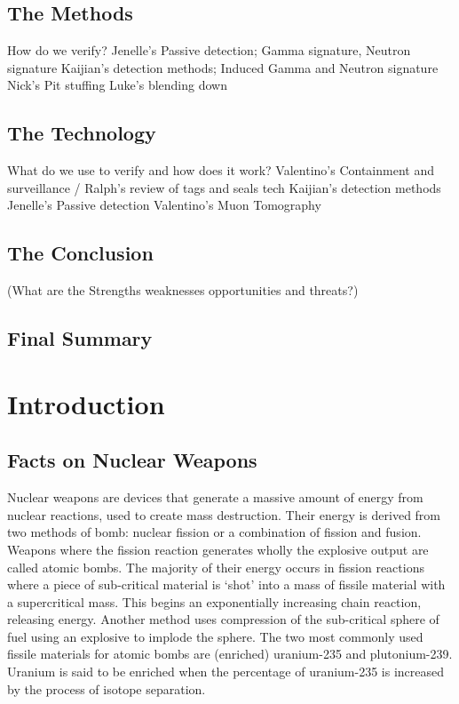 \documentclass[twocolumn,a4paper]{article}
\begin{document}
\subsection*{The Methods}
How do we verify?
Jenelle's Passive detection; Gamma signature, Neutron signature
Kaijian's detection methods; Induced Gamma and Neutron signature 
Nick's Pit stuffing
Luke's blending down
\subsection*{The Technology}
What do we use to verify and how does it work?
Valentino's Containment and surveillance / Ralph's review of tags and seals tech
Kaijian's detection methods
Jenelle's Passive detection
Valentino's Muon Tomography 

\subsection*{The Conclusion}
(What are the Strengths weaknesses opportunities and threats?)
\subsection*{Final Summary}

\newpage
\tableofcontents
\twocolumn

\section{Introduction}

\subsection{Facts on Nuclear Weapons}
Nuclear weapons are devices that generate a massive amount of energy
from nuclear reactions, used to create mass destruction. Their energy
is derived from two methods of bomb: nuclear fission or a combination
of fission and fusion. Weapons where the fission reaction generates
wholly the explosive output are called atomic bombs. The majority of
their energy occurs in fission reactions where a piece of sub-critical
material is `shot' into a mass of fissile material with a
supercritical mass. This begins an exponentially increasing chain
reaction, releasing energy. Another method uses compression of the
sub-critical sphere of fuel using an explosive to implode the
sphere. The two most commonly used fissile materials for atomic bombs
are (enriched) uranium-235 and plutonium-239. Uranium is said to be
enriched when the percentage of uranium-235 is increased by the
process of isotope separation.
\end{document}
